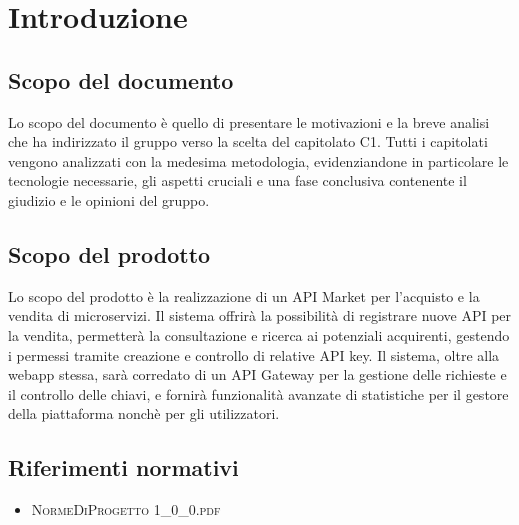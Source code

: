 \newpage
\section{Introduzione}
\subsection{Scopo del documento}
Lo scopo del documento è quello di presentare le motivazioni e la breve analisi che ha indirizzato il gruppo verso la scelta del capitolato C1. Tutti i capitolati vengono analizzati con la medesima metodologia, evidenziandone in particolare le tecnologie necessarie, gli aspetti cruciali e una fase conclusiva contenente il giudizio e le opinioni del gruppo.

\subsection{Scopo del prodotto}
Lo scopo del prodotto è la realizzazione di un API Market per l'acquisto e la vendita di microservizi. Il sistema offrirà la possibilità di registrare nuove API per la vendita, permetterà la consultazione e ricerca ai potenziali acquirenti, gestendo i permessi tramite creazione e controllo di relative API key. Il sistema, oltre alla webapp stessa, sarà corredato di un API Gateway per la gestione delle richieste e il controllo delle chiavi, e fornirà funzionalità avanzate di statistiche per il gestore della piattaforma nonchè per gli utilizzatori.

\subsection{Riferimenti normativi}
\begin{itemize}
	\item \textsc{NormeDiProgetto 1\_0\_0.pdf}
\end{itemize}

